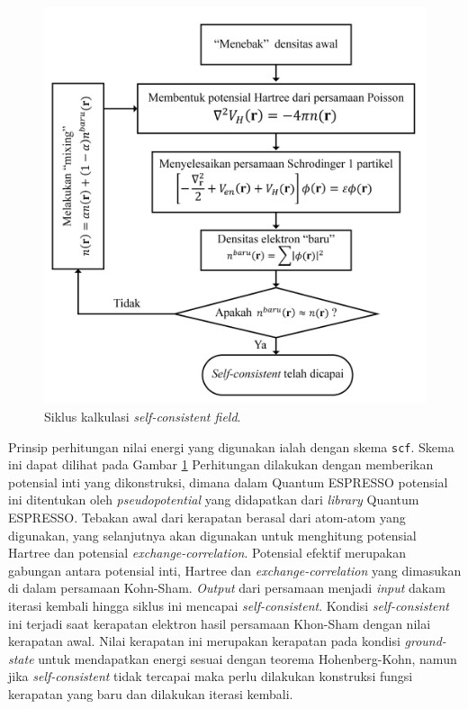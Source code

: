 \begin{figure}
    \centering
    \includegraphics[width=12cm]{gambar/Flowchart SCF.png}
    \caption{Siklus kalkulasi \textit{self-consistent field}.}
    \label{fig:SCF}
\end{figure}
Prinsip perhitungan nilai energi yang digunakan ialah dengan skema \texttt{scf}. Skema ini dapat dilihat pada Gambar \ref{fig:SCF} Perhitungan dilakukan dengan memberikan potensial inti yang dikonstruksi, dimana dalam Quantum ESPRESSO potensial ini ditentukan oleh \textit{pseudopotential} yang didapatkan dari \textit{library} Quantum ESPRESSO. Tebakan awal dari kerapatan berasal dari atom-atom yang digunakan, yang selanjutnya akan digunakan untuk menghitung potensial Hartree dan potensial \textit{exchange-correlation}. Potensial efektif merupakan gabungan antara potensial inti, Hartree dan \textit{exchange-correlation} yang dimasukan di dalam persamaan Kohn-Sham. \textit{Output} dari persamaan menjadi \textit{input} dakam iterasi kembali hingga siklus ini mencapai \textit{self-consistent}. Kondisi \textit{self-consistent} ini terjadi saat kerapatan elektron hasil persamaan Khon-Sham dengan nilai kerapatan awal. Nilai kerapatan ini merupakan kerapatan pada kondisi \textit{ground-state} untuk mendapatkan energi sesuai dengan teorema Hohenberg-Kohn, namun jika \textit{self-consistent} tidak tercapai maka perlu dilakukan konstruksi fungsi kerapatan yang baru dan dilakukan iterasi kembali.

